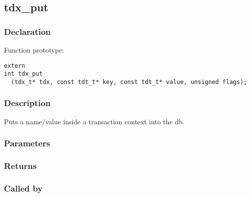 
\newpage
\subsection{tdx\_put}
\subsubsection{Declaration} Function prototype:

\begin{verbatim}
extern
int tdx_put
  (tdx_t* tdx, const tdt_t* key, const tdt_t* value, unsigned flags);
\end{verbatim}

\subsubsection{Description}


 Puts a name/value inside a transaction context into the db.
 

\subsubsection{Parameters}
\subsubsection{Returns}
\subsubsection{Called by}
